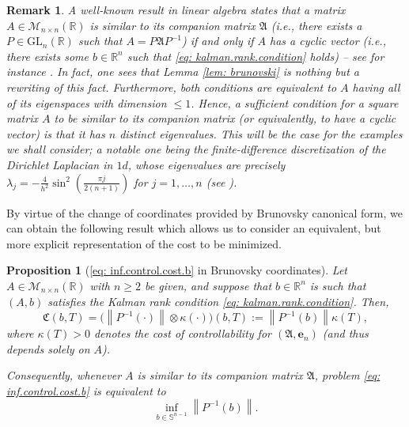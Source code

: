 \documentclass[11pt, a4paper, reqno]{amsart}
\newcommand{\R}{\mathbb{R}}
\theoremstyle{plain}
\numberwithin{equation}{section}
\newtheorem{remark}{Remark}
\newtheorem{proposition}{Proposition}[section]
\begin{document}
	\begin{remark} A well-known result in linear algebra states that a matrix $A\in \mathcal{M}_{n\times n}(\R)$ is similar to its companion matrix $\mathfrak{A}$ (i.e., there exists a $P\in\mathrm{GL}_n(\R)$ such that $A=P\mathfrak{A}P^{-1}$) if and only if $A$ has a cyclic vector (i.e., there exists some $b\in\R^n$ such that \eqref{eq: kalman.rank.condition} holds) -- see for instance \citep[Theorem 3.3.15]{horn2012matrix}. In fact, one sees that Lemma \ref{lem: brunovski} is nothing but a rewriting of this fact. Furthermore, both conditions are equivalent to $A$ having all of its eigenspaces with dimension $\leqslant1$. Hence, a sufficient condition for a square matrix $A$ to be similar to its companion matrix (or equivalently, to have a cyclic vector) is that it has $n$ distinct eigenvalues. This will be the case for the examples we shall consider; a notable one being the finite-difference discretization of the Dirichlet Laplacian in $1d$, whose eigenvalues are precisely $\lambda_j = -\frac{4}{h^2}\sin^2\left(\frac{\pi j}{2(n+1)}\right)$ for $j=1,\ldots,n$ (see \citep{vichnevetsky1982fourier}).
	\end{remark}

	\noindent
	By virtue of the change of coordinates provided by Brunovsky canonical form, we can obtain the following result which allows us to consider an equivalent, but more explicit representation of the cost to be minimized.
	
	\begin{proposition}[\eqref{eq: inf.control.cost.b} in Brunovsky coordinates] \label{prop: brunovsky.reform}
	Let $A\in \mathcal{M}_{n\times n}(\R)$ with $n\geqslant2$ be given, and suppose that $b\in\R^n$ is such that $(A,b)$ satisfies the Kalman rank condition \eqref{eq: kalman.rank.condition}.
	Then,
	\begin{equation*}
	\mathfrak{C}(b,T) = \Big(\left\|P^{-1}(\cdot)\right\| \otimes \kappa(\cdot)\Big)(b,T) := \left\|P^{-1}(b)\right\| \kappa(T),
	\end{equation*}
	where $\kappa(T)>0$ denotes the cost of controllability for $(\mathfrak{A}, \mathbf{e}_n)$ (and thus depends solely on $A$). 
	
	Consequently, whenever $A$ is similar to its companion matrix $\mathfrak{A}$, problem \eqref{eq: inf.control.cost.b} is equivalent to 
	\begin{equation} \label{eq: 18}
	\boxed{
	\inf_{b \in \mathbb{S}^{n-1}} \left\|P^{-1}(b)\right\|.
	}
	\end{equation}
	\end{proposition}
	
\end{document}
